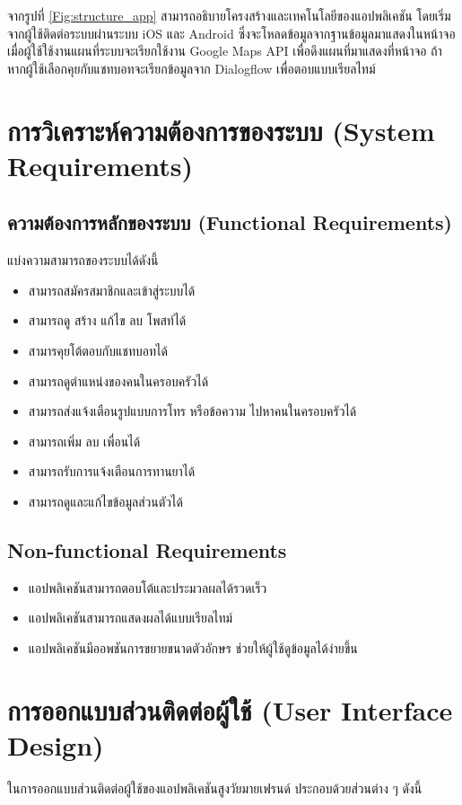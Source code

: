 จากรูปที่ \ref{Fig:structure_app} สามารถอธิบายโครงสร้างและเทคโนโลยีของแอปพลิเคชัน โดยเริ่มจากผู้ใช้ติดต่อระบบผ่านระบบ iOS และ Android ซึ่งจะโหลดข้อมูลจากฐานข้อมูลมาแสดงในหน้าจอ เมื่อผู้ใช้ใช้งานแผนที่ระบบจะเรียกใช้งาน Google Maps API เพื่อดึงแผนที่มาแสดงที่หน้าจอ ถ้าหากผู้ใช้เลือกคุยกับแชทบอทจะเรียกข้อมูลจาก Dialogflow เพื่อตอบแบบเรียลไทม์

\section{การวิเคราะห์ความต้องการของระบบ (System Requirements)}

\subsection{ความต้องการหลักของระบบ (Functional Requirements)}
	แบ่งความสามารถของระบบได้ดังนี้
		\begin{itemize}[label={--}]
			\item สามารถสมัครสมาชิกและเข้าสู่ระบบได้
			\item สามารถดู สร้าง แก้ไข ลบ โพสท์ได้
			\item สามารคุยโต้ตอบกับแชทบอทได้
			\item สามารถดูตำแหน่งของคนในครอบครัวได้
			\item สามารถส่งแจ้งเตือนรูปแบบการโทร หรือข้อความ ไปหาคนในครอบครัวได้
			\item สามารถเพิ่ม ลบ เพื่อนได้
			\item สามารถรับการแจ้งเตือนการทานยาได้
			\item สามารถดูและแก้ไขข้อมูลส่วนตัวได้
		\end{itemize}

\subsection{Non-functional Requirements}
		\begin{itemize}[label={--}]
			\item แอปพลิเคชันสามารถตอบโต้และประมวลผลได้รวดเร็ว
			\item แอปพลิเคชันสามารถแสดงผลได้แบบเรียลไทม์
			\item แอปพลิเคชันมีออพชันการขยายขนาดตัวอักษร ช่วยให้ผู้ใช้ดูข้อมูลได้ง่ายขึ้น
		\end{itemize}
	

\section{การออกแบบส่วนติดต่อผู้ใช้ (User Interface Design)}
ในการออกแบบส่วนติดต่อผู้ใช้ของแอปพลิเคชันสูงวัยมายเฟรนด์ ประกอบด้วยส่วนต่าง ๆ ดังนี้
